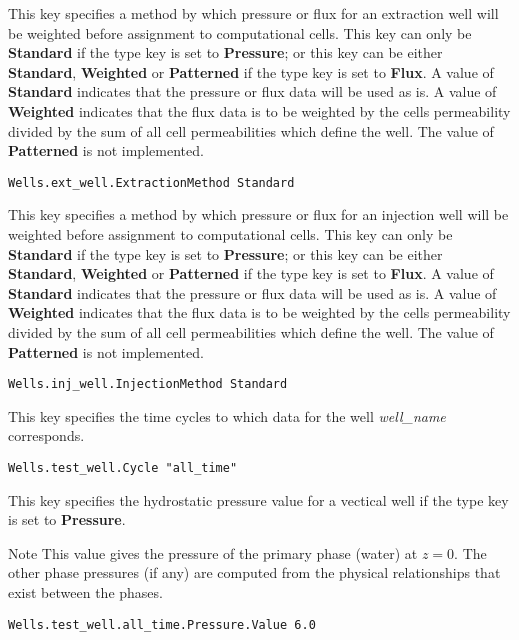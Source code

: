 {
This key specifies a method by which pressure or flux for an extraction
well will be weighted before assignment to computational cells.  This
key can only be {\bf Standard} if the type key is set to {\bf Pressure};
or this key can be either {\bf Standard}, {\bf Weighted} or
{\bf Patterned} if the type key is set to {\bf Flux}.  A value of
{\bf Standard} indicates that the pressure or flux data will be used as
is.  A value of {\bf Weighted} indicates that the flux data is to be
weighted by the cells permeability divided by the sum of all cell
permeabilities which define the well.  The value of {\bf Patterned} is
not implemented.
}
\begin{display}\begin{verbatim}
Wells.ext_well.ExtractionMethod Standard
\end{verbatim}\end{display}

{
This key specifies a method by which pressure or flux for an injection
well will be weighted before assignment to computational cells.  This
key can only be {\bf Standard} if the type key is set to {\bf Pressure};
or this key can be either {\bf Standard}, {\bf Weighted} or
{\bf Patterned} if the type key is set to {\bf Flux}.  A value of
{\bf Standard} indicates that the pressure or flux data will be used as
is.  A value of {\bf Weighted} indicates that the flux data is to be
weighted by the cells permeability divided by the sum of all cell
permeabilities which define the well.  The value of {\bf Patterned} is
not implemented.
}
\begin{display}\begin{verbatim}
Wells.inj_well.InjectionMethod Standard
\end{verbatim}\end{display}

{
This key specifies the time cycles to which data for the well
{\em well\_name} corresponds. 
}
\begin{display}\begin{verbatim}
Wells.test_well.Cycle "all_time"
\end{verbatim}\end{display}

{
This key specifies the hydrostatic pressure value for a vectical well
if the type key is set to {\bf Pressure}.

Note This value gives the pressure of the primary phase (water) at
$z=0$.  The other phase pressures (if any) are computed from the physical
relationships that exist between the phases.
}
\begin{display}\begin{verbatim}
Wells.test_well.all_time.Pressure.Value 6.0
\end{verbatim}\end{display}

